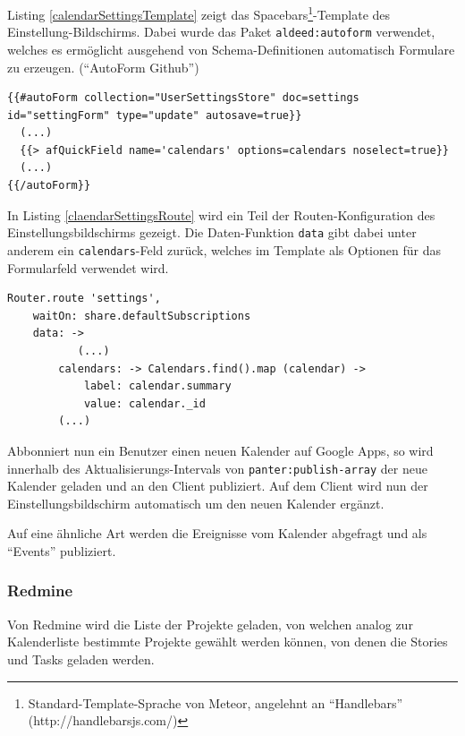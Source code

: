 \documentclass[]{article}
\begin{document}
Listing \ref{calendarSettingsTemplate} zeigt das Spacebars\footnote{Standard-Template-Sprache
  von Meteor, angelehnt an ``Handlebars'' (http://handlebarsjs.com/)}-Template
des Einstellung-Bildschirms. Dabei wurde das Paket
\lstinline!aldeed:autoform! verwendet, welches es ermöglicht ausgehend
von Schema-Definitionen automatisch Formulare zu erzeugen. (``AutoForm
Github'')

\begin{lstlisting}[caption=Spacebars-Template zur Abbildung \ref{figCalendarSettings}, label=calendarSettingsTemplate]
{{#autoForm collection="UserSettingsStore" doc=settings id="settingForm" type="update" autosave=true}}
  (...)
  {{> afQuickField name='calendars' options=calendars noselect=true}}
  (...)
{{/autoForm}}
\end{lstlisting}

In Listing \ref{claendarSettingsRoute} wird ein Teil der
Routen-Konfiguration des Einstellungsbildschirms gezeigt. Die
Daten-Funktion \lstinline!data! gibt dabei unter anderem ein
\lstinline!calendars!-Feld zurück, welches im Template als Optionen für
das Formularfeld verwendet wird.

\begin{lstlisting}[caption=Routen-Konfiguration für den Einstellungsbildschirm auf Abbildung \ref{figCalendarSettings} in CoffeeScript, label=claendarSettingsRoute]
Router.route 'settings', 
    waitOn: share.defaultSubscriptions
    data: ->
           (...)
        calendars: -> Calendars.find().map (calendar) ->
            label: calendar.summary
            value: calendar._id
        (...)
\end{lstlisting}

Abbonniert nun ein Benutzer einen neuen Kalender auf Google Apps, so
wird innerhalb des Aktualisierungs-Intervals von
\lstinline!panter:publish-array! der neue Kalender geladen und an den
Client publiziert. Auf dem Client wird nun der Einstellungsbildschirm
automatisch um den neuen Kalender ergänzt.

Auf eine ähnliche Art werden die Ereignisse vom Kalender abgefragt und
als ``Events'' publiziert.

\subsubsection{Redmine}\label{redmine-1}

Von Redmine wird die Liste der Projekte geladen, von welchen analog zur
Kalenderliste bestimmte Projekte gewählt werden können, von denen die
Stories und Tasks geladen werden.
\end{document}
